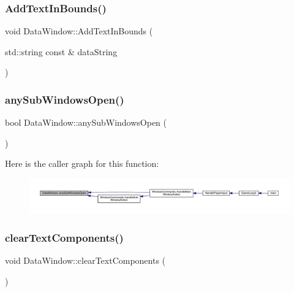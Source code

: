 \subsubsection{\texorpdfstring{Add\+Text\+In\+Bounds()}{AddTextInBounds()}}
{\footnotesize\ttfamily void Data\+Window\+::\+Add\+Text\+In\+Bounds (\begin{DoxyParamCaption}\item[{std\+::string const \&}]{data\+String }\end{DoxyParamCaption})}

\mbox{\label{class_data_window_a141dab549c8f1e91304990ff1547476c}} 
\subsubsection{\texorpdfstring{any\+Sub\+Windows\+Open()}{anySubWindowsOpen()}}
{\footnotesize\ttfamily bool Data\+Window\+::any\+Sub\+Windows\+Open (\begin{DoxyParamCaption}{ }\end{DoxyParamCaption})}

Here is the caller graph for this function\+:
\nopagebreak
\begin{figure}[H]
\begin{center}
\leavevmode
\includegraphics[width=350pt]{d1/def/class_data_window_a141dab549c8f1e91304990ff1547476c_icgraph}
\end{center}
\end{figure}
\mbox{\label{class_data_window_a2f7b8defc928dcf530149a82bdd16d53}} 
\subsubsection{\texorpdfstring{clear\+Text\+Components()}{clearTextComponents()}}
{\footnotesize\ttfamily void Data\+Window\+::clear\+Text\+Components (\begin{DoxyParamCaption}{ }\end{DoxyParamCaption})}

